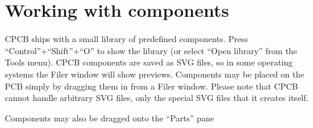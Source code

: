 \documentclass[11pt]{report}
\begin{document}
\section{Working with components}
CPCB ships with a small library of predefined components. Press
``Control''+``Shift''+``O'' to show the library (or select ``Open
library'' from the Tools menu). CPCB components are saved as SVG
files, so in some operating systems the Filer window will show
previews. Components may be placed on the PCB simply by dragging them
in from a Filer window. Please note that CPCB cannot handle arbitrary
SVG files, only the special SVG files that it creates itself.

Components may also be dragged onto the ``Parts'' pane
\end{document}
